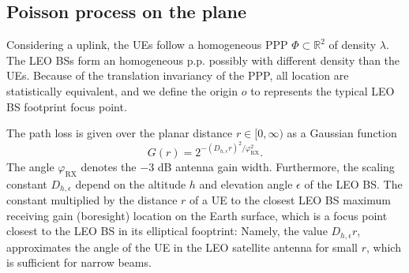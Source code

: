 \documentclass[lettersize,journal]{IEEEtran}
\newcommand{\R}{\mathbb{R}}
\newtheorem*{remark}{Remark}
\begin{document}
\label{sec:analysissec}




\subsection{Poisson process on the plane}
\label{sec:gainprocess}


Considering a uplink, the UEs follow a homogeneous PPP $\Phi \subset \R^2$ of density $\lambda$. The LEO BSs form an homogeneous p.p. possibly with different density than the UEs. Because of the translation invariancy of the PPP, all location are statistically equivalent, and we define the origin $\textit{o}$ to represents the typical LEO BS footprint focus point.

The path loss is given over the planar distance $r \in [0, \infty)$ as a Gaussian function
  \begin{equation}
    \label{eq:Gaussianantpat}
    G(r) = 2^{-(D_{h,\epsilon}r)^2 / \varphi_{\text{RX}}^2}.
  \end{equation}
  The angle $\varphi_{\text{RX}}$ denotes the $-3$ dB antenna gain width. Furthermore, the scaling constant $D_{h,\epsilon}$ depend on the altitude $h$ and elevation angle $\epsilon$ of the LEO BS. The constant multiplied by the distance $r$ of a UE to the closest LEO BS maximum receiving gain (boresight) location on the Earth surface, which is a focus point closest to the LEO BS in its elliptical fooptrint: Namely, the value $D_{h,\epsilon}r$, approximates the angle of the UE in the LEO satellite antenna for small $r$, which is sufficient for narrow beams. %


\end{document}
